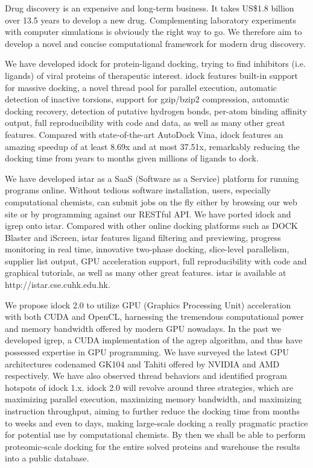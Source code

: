 Drug discovery is an expensive and long-term business. It takes US\$1.8 billion over 13.5 years to develop a new drug. Complementing laboratory experiments with computer simulations is obviously the right way to go. We therefore aim to develop a novel and concise computational framework for modern drug discovery.

We have developed idock for protein-ligand docking, trying to find inhibitors (i.e. ligands) of viral proteins of therapeutic interest. idock features built-in support for massive docking, a novel thread pool for parallel execution, automatic detection of inactive torsions, support for gzip/bzip2 compression, automatic docking recovery, detection of putative hydrogen bonds, per-atom binding affinity output, full reproducibility with code and data, as well as many other great features. Compared with state-of-the-art AutoDock Vina, idock features an amazing speedup of at least 8.69x and at most 37.51x, remarkably reducing the docking time from years to months given millions of ligands to dock.

We have developed istar as a SaaS (Software as a Service) platform for running programs online. Without tedious software installation, users, especially computational chemists, can submit jobs on the fly either by browsing our web site or by programming against our RESTful API. We have ported idock and igrep onto istar. Compared with other online docking platforms such as DOCK Blaster and iScreen, istar features ligand filtering and previewing, progress monitoring in real time, innovative two-phase docking, slice-level parallelism, supplier list output, GPU acceleration support, full reproducibility with code and graphical tutorials, as well as many other great features. istar is available at http://istar.cse.cuhk.edu.hk.

We propose idock 2.0 to utilize GPU (Graphics Processing Unit) acceleration with both CUDA and OpenCL, harnessing the tremendous computational power and memory bandwidth offered by modern GPU nowadays. In the past we developed igrep, a CUDA implementation of the agrep algorithm, and thus have possessed expertise in GPU programming. We have surveyed the latest GPU architectures codenamed GK104 and Tahiti offered by NVIDIA and AMD respectively. We have also observed thread behaviors and identified program hotspots of idock 1.x. idock 2.0 will revolve around three strategies, which are maximizing parallel execution, maximizing memory bandwidth, and maximizing instruction throughput, aiming to further reduce the docking time from months to weeks and even to days, making large-scale docking a really pragmatic practice for potential use by computational chemists. By then we shall be able to perform proteomic-scale docking for the entire solved proteins and warehouse the results into a public database.

